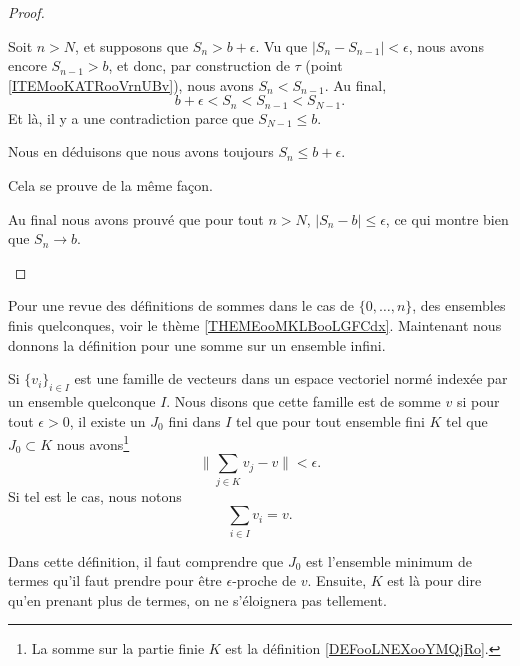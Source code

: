 \begin{proof}
\begin{subproof}
\begin{subproof}
			Soit \( n>N\), et supposons que \( S_n>b+\epsilon\). Vu que \( | S_n-S_{n-1} |<\epsilon\), nous avons encore \( S_{n-1}>b\), et donc, par construction de \( \tau\) (point \ref{ITEMooKATRooVrnUBv}), nous avons \( S_n<S_{n-1}\). Au final,
			\begin{equation}
				b+\epsilon<S_n<S_{n-1}<S_{N-1}.
			\end{equation}
			Et là, il y a une contradiction parce que \( S_{N-1}\leq b\).

			Nous en déduisons que nous avons toujours \( S_n\leq b+\epsilon\).


			Cela se prouve de la même façon.

		\end{subproof}
		Au final nous avons prouvé que pour tout \( n>N\), \( | S_n-b |\leq \epsilon\), ce qui montre bien que \( S_n\to b\).
	\end{subproof}
\end{proof}


Pour une revue des définitions de sommes dans le cas de \( \{ 0,\ldots, n \}\), des ensembles finis quelconques, voir le thème \ref{THEMEooMKLBooLGFCdx}. Maintenant nous donnons la définition pour une somme sur un ensemble infini.
\begin{definition}  \label{DefIkoheE}
	Si \( \{ v_i \}_{i\in I}\) est une famille de vecteurs dans un espace vectoriel normé indexée par un ensemble quelconque \( I\). Nous disons que cette famille est  de somme \( v\) si pour tout \( \epsilon>0\), il existe un \( J_0\) fini dans \( I\) tel que pour tout ensemble fini \( K\) tel que \( J_0\subset K\) nous avons\footnote{La somme sur la partie finie \( K\) est la définition \ref{DEFooLNEXooYMQjRo}.}
	\begin{equation}
		\| \sum_{j\in K}v_j-v \|<\epsilon.
	\end{equation}
	Si tel est le cas, nous notons
	\begin{equation}
		\sum_{i\in I}v_i=v.
	\end{equation}
\end{definition}
Dans cette définition, il faut comprendre que \( J_0\) est l'ensemble minimum de termes qu'il faut prendre pour être \( \epsilon\)-proche de \( v\). Ensuite, \( K\) est là pour dire qu'en prenant plus de termes, on ne s'éloignera pas tellement.


